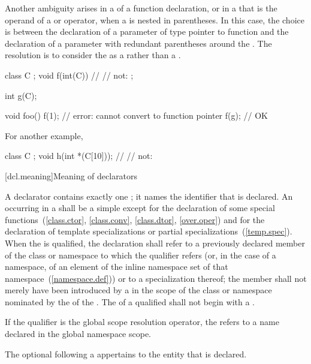 \pnum
Another ambiguity arises in a
of a function declaration, or in a
that is the operand of a
or
operator, when a
is nested in parentheses.
In this case, the choice is between the declaration of a parameter of type
pointer to function and the declaration of a parameter with redundant
parentheses around the
.
The resolution is to consider the
as a
rather than a
.
\begin{example}

\begin{codeblock}
class C { };
void f(int(C)) { }              // 
                                // not: ;

int g(C);

void foo() {
  f(1);                         // error: cannot convert  to function pointer
  f(g);                         // OK
}
\end{codeblock}

For another example,

\begin{codeblock}
class C { };
void h(int *(C[10]));           // 
                                // not: 
\end{codeblock}
\end{example}

[dcl.meaning]{Meaning of declarators}%

\pnum
{}%
A declarator contains exactly one
;
it names the identifier that is declared.
An
occurring in
a
shall be a simple
except for the declaration of some special functions~(\ref{class.ctor},
\ref{class.conv}, \ref{class.dtor}, \ref{over.oper}) and
for the declaration of template specializations
or partial specializations~(\ref{temp.spec}).
When the
is qualified, the declaration shall refer to a previously declared member
of the class or namespace to which the qualifier refers (or,
in the case of a namespace,
of an element of the inline namespace
set of that namespace~(\ref{namespace.def})) or to a specialization thereof; the member
shall not merely have been introduced by a
in the scope of the class or namespace nominated by the
of the
.
The  of a qualified  shall not
begin with a .
\begin{note}
If the qualifier is the global
\tcode{::}
scope resolution operator, the
refers to a name declared in the global namespace scope.
\end{note}
The optional  following a  appertains to the entity that is declared.

